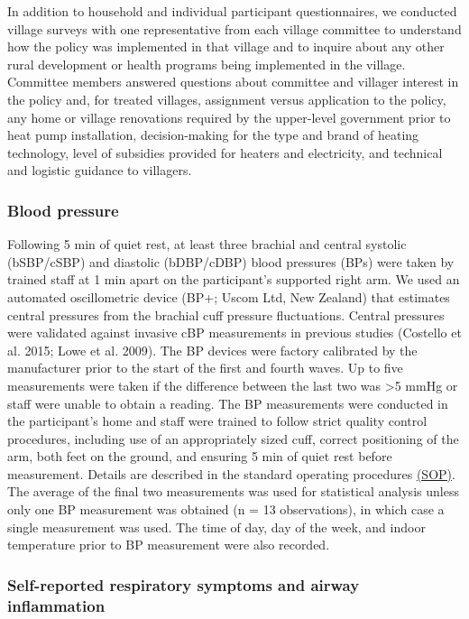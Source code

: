 \documentclass[
  letterpaper,
  DIV=11,
  numbers=noendperiod]{scrartcl}
\begin{document}
In addition to household and individual participant questionnaires, we
conducted village surveys with one representative from each village
committee to understand how the policy was implemented in that village
and to inquire about any other rural development or health programs
being implemented in the village. Committee members answered questions
about committee and villager interest in the policy and, for treated
villages, assignment versus application to the policy, any home or
village renovations required by the upper-level government prior to heat
pump installation, decision-making for the type and brand of heating
technology, level of subsidies provided for heaters and electricity, and
technical and logistic guidance to villagers.

\subsubsection{Blood pressure}\label{blood-pressure}

Following 5 min of quiet rest, at least three brachial and central
systolic (bSBP/cSBP) and diastolic (bDBP/cDBP) blood pressures (BPs)
were taken by trained staff at 1 min apart on the participant's
supported right arm. We used an automated oscillometric device (BP+;
Uscom Ltd, New Zealand) that estimates central pressures from the
brachial cuff pressure fluctuations. Central pressures were validated
against invasive cBP measurements in previous studies (Costello et al.
2015; Lowe et al. 2009). The BP devices were factory calibrated by the
manufacturer prior to the start of the first and fourth waves. Up to
five measurements were taken if the difference between the last two was
\textgreater5 mmHg or staff were unable to obtain a reading. The BP
measurements were conducted in the participant's home and staff were
trained to follow strict quality control procedures, including use of an
appropriately sized cuff, correct positioning of the arm, both feet on
the ground, and ensuring 5 min of quiet rest before measurement. Details
are described in the standard operating procedures
\href{https://osf.io/gmka5}{(SOP)}. The average of the final two
measurements was used for statistical analysis unless only one BP
measurement was obtained (n = 13 observations), in which case a single
measurement was used. The time of day, day of the week, and indoor
temperature prior to BP measurement were also recorded.

\subsubsection{Self-reported respiratory symptoms and airway
inflammation}\label{self-reported-respiratory-symptoms-and-airway-inflammation}
\end{document}
